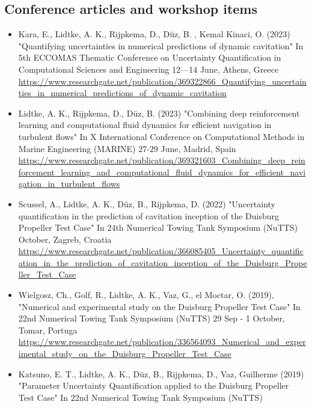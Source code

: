 \documentclass[a4paper,10pt]{article}
\begin{document}
\subsection{Conference articles and workshop items}
%
\begin{itemize}
%
\item Kara, E., Lidtke, A. K., Rijpkema, D.,  D{\"u}z, B. , Kemal Kinaci, O. (2023)
	"Quantifying uncertainties in numerical predictions of dynamic cavitation"
	In 5th ECCOMAS Thematic Conference on Uncertainty Quantification in Computational Sciences and Engineering
	12—14 June, Athens, Greece
	\cite{kara_quantifying_2023}
	\\ \url{https://www.researchgate.net/publication/369322866_Quantifying_uncertainties_in_numerical_predictions_of_dynamic_cavitation}
%
\item  Lidtke, A. K., Rijpkema, D.,  D{\"u}z, B. (2023)
	"Combining deep reinforcement learning and computational fluid dynamics for efficient navigation in turbulent flows"
	In X International Conference on Computational Methods in Marine Engineering (MARINE)
	27-29 June, Madrid, Spain
	\cite{lidtke_combining_2023}
	\\ \url{https://www.researchgate.net/publication/369321603_Combining_deep_reinforcement_learning_and_computational_fluid_dynamics_for_efficient_navigation_in_turbulent_flows}
%
\item Scussel, A., Lidtke, A. K., D{\"u}z, B., Rijpkema, D. (2022)
	"Uncertainty quantification in the prediction of cavitation inception of the Duisburg Propeller Test Case"
	In 24th Numerical Towing Tank Symposium (NuTTS)
	October, Zagreb, Croatia
	\cite{scussel_uncertainty_2022}
	\\ \url{https://www.researchgate.net/publication/366085405_Uncertainty_quantification_in_the_prediction_of_cavitation_inception_of_the_Duisburg_Propeller_Test_Case}
%
\item Wielgosz, Ch., Golf, R., Lidtke, A. K., Vaz, G., el Moctar, O. (2019),
	"Numerical and experimental study on the Duisburg Propeller Test Case"
	In 22nd Numerical Towing Tank Symposium (NuTTS)
	29 Sep - 1 October, Tomar, Portuga
	\cite{Wielgosz2019}
	\\ \url{https://www.researchgate.net/publication/336564093_Numerical_and_experimental_study_on_the_Duisburg_Propeller_Test_Case}
%
\item Katsuno, E. T., Lidtke, A. K., D{\"u}z, B., Rijpkema, D., Vaz, Guilherme (2019)
	"Parameter Uncertainty Quantification applied to the Duisburg Propeller Test Case"
	In 22nd Numerical Towing Tank Symposium (NuTTS)

\end{itemize}
\end{document}
